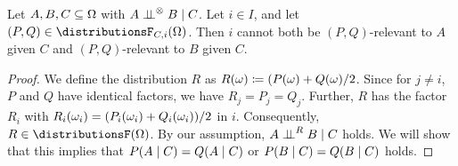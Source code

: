 \documentclass[USenglish,onecolumn]{article}
\begin{document}
\begin{lemma}
  \label{lemma:exclusion_principle}
  Let $A, B, C \subseteq \Omega$ with $A \mathrel{\perp\!\!\!\perp}^\otimes B \mid C$.
  Let $i \in I$, and let $(P, Q) \in \distributionsF_{C, i}(\Omg)$. Then $i$ cannot both be $(P,Q)$-relevant to $A$ given $C$ and $(P,Q)$-relevant to $B$ given $C$.
\end{lemma}

\begin{proof}
  We define the distribution $R$ as $R(\omega) \coloneqq (P(\omega) + Q(\omega)/2$.
  Since for $j\ne i$, $P$ and $Q$ have identical factors, we have $R_j=P_j=Q_j$. Further, $R$ has the factor $R_i$ with $R_i(\omega_i) = (P_i(\omega_i) + Q_i(\omega_i))/2$ in $i$.
  Consequently, $R \in \distributionsF(\Omg)$.
  By our assumption, $A \mathrel{\perp\!\!\!\perp}^R B \mid C$ holds.
  We will show that this implies that $P(A \mid C) = Q(A \mid C)$ or $P(B \mid C) = Q(B \mid C)$ holds.


\end{proof}
\end{document}
